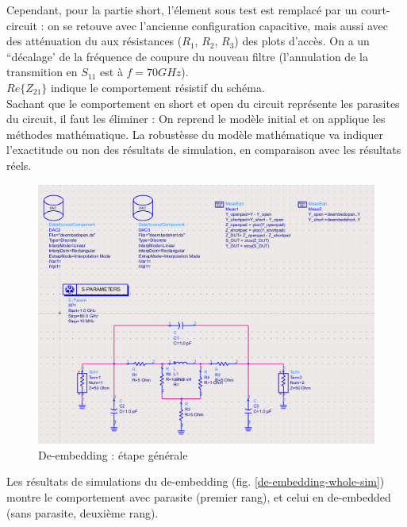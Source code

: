 \documentclass[a4paper]{article}
\begin{document}
Cependant, pour la partie short, l'\'element sous test est remplac\'e par un court-circuit : on se retouve avec l'ancienne
configuration capacitive, mais aussi avec des att\'enuation du aux r\'esistances ($R_1$, $R_2$, $R_3$) des plots d'acc\`es.
On a un ``d\'ecalage' de la fr\'equence de coupure du nouveau filtre (l'annulation de la transmition en $S_{11}$ est \`a $f= 70 GHz$).
\\
$Re\{Z_{21}\}$ indique le comportement r\'esistif du sch\'ema.\\
Sachant que le comportement en short et open du circuit repr\'esente les parasites du circuit, il faut les \'eliminer : On reprend le
mod\`ele initial et on applique les m\'ethodes math\'ematique. La robust\`esse du mod\`ele math\'ematique va indiquer l'exactitude ou
non des r\'esultats de simulation, en comparaison avec les r\'esultats r\'eels.

\begin{figure}[!htb]
\begin{center}
  \includegraphics[scale=0.40]{de_embedding_whole.png}
  \caption{De-embedding : \'etape g\'en\'erale}
  \label{de-embedding-whole}
\end{center}
\end{figure}

Les r\'esultats de simulations du de-embedding (fig. \ref{de-embedding-whole-sim}) montre le comportement avec parasite (premier rang),
et celui en de-embedded (sans parasite, deuxi\`eme rang).
\end{document}
